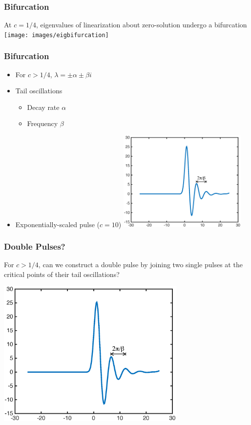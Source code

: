 \documentclass[16pt]{beamer}
\begin{document}
\begin{frame}
	\frametitle{Bifurcation}
	\fontsize{16}{7.2}\selectfont
	At $c = 1/4$, eigenvalues of linearization about zero-solution undergo a bifurcation
	\texttt{[image: images/eigbifurcation]}
\end{frame}

\begin{frame}
	\frametitle{Bifurcation}
	\fontsize{16}{7.2}\selectfont
	\begin{itemize}
		\item<1-> For $c > 1/4$, $\lambda = \pm \alpha \pm \beta i$
		\vspace{0.5cm}
		\item<2-> Tail oscillations
		\begin{itemize}
			\item Decay rate $\alpha$
			\item Frequency $\beta$
		\end{itemize}
		\vspace{0.5cm}
		\item<3-> Exponentially-scaled pulse ($c = 10$)
		\includegraphics[width=0.5\textwidth]{images/singlepulsemag}
	\end{itemize}
\end{frame}

\begin{frame}
	\frametitle{Double Pulses?}
	\fontsize{16}{7.2}\selectfont

	For $c>1/4$, can we construct a double pulse by joining two single pulses at the critical points of their tail oscillations?

	\begin{center}
	\includegraphics[width=0.7\textwidth]{images/singlepulsemag}
	\end{center}

\end{frame}
\end{document}
